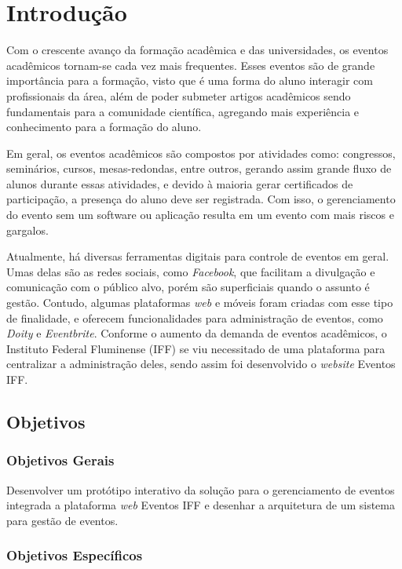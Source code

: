 \chapter{Introdução}

Com o crescente avanço da formação acadêmica e das universidades, os eventos acadêmicos tornam-se cada vez mais frequentes. Esses eventos são de grande importância para a formação, visto que é uma forma do aluno interagir com profissionais da área, além de poder submeter artigos acadêmicos sendo fundamentais para a comunidade científica, agregando mais experiência e conhecimento para a formação do aluno.

Em geral, os eventos acadêmicos são compostos por atividades como: congressos, seminários, cursos, mesas-redondas, entre outros, gerando assim grande fluxo de alunos durante essas atividades, e devido à maioria gerar certificados de participação, a presença do aluno deve ser registrada. Com isso, o gerenciamento do evento sem um software ou aplicação resulta em um evento com mais riscos e gargalos. 

Atualmente, há diversas ferramentas digitais para controle de eventos em geral. Umas delas são as redes sociais, como \textit{Facebook}, que facilitam a divulgação e comunicação com o público alvo, porém são superficiais quando o assunto é gestão. Contudo, algumas plataformas \textit{web} e móveis foram criadas com esse tipo de finalidade, e oferecem funcionalidades para administração de eventos, como \textit{Doity} e \textit{Eventbrite}. 
Conforme o aumento da demanda de eventos acadêmicos, o Instituto Federal Fluminense (IFF) se viu necessitado de uma plataforma para centralizar a administração deles, sendo assim foi desenvolvido o \textit{website} Eventos IFF.

\section{Objetivos}
\subsection{Objetivos Gerais}

Desenvolver um protótipo interativo da solução para o gerenciamento de eventos integrada a plataforma \textit{web} Eventos IFF e desenhar a arquitetura de um sistema para gestão de eventos.

\subsection{Objetivos Específicos}

